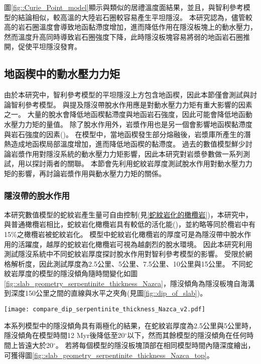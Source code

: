 圖\ref{fig::Curie_Point_model}顯示與\citealp{Manea2011Curie}類似的居禮溫度面結果，並且，與智利參考模型的結論相似，較高溫的大陸岩石圈較容易產生平坦隱沒。
本研究認為，儘管較高的岩石圈溫度會導致地函黏滯度增加，進而降低作用在隱沒板塊上的動水壓力，然而溫度升高同時導致岩石圈強度下降，此時隱沒板塊容易將弱的地函岩石圈推開，促使平坦隱沒發育。

\subsection{地函楔中的動水壓力力矩}
由於本研究中，智利參考模型的平坦隱沒上方包含地函楔，因此本節僅會測試與討論智利參考模型。
\citealp{Manea2007}與\citealp{Yan2020}提及隱沒帶脫水作用應是對動水壓力力矩有重大影響的因素之一。
大量的脫水會降低地函楔黏滯度與地函岩石強度，因此可能會降低地函動水壓力力矩的量值。
除了脫水作用外，岩漿作用也是另一個會影響地函楔黏滯度與岩石強度的因素(\citealp{jamieson2011crustal})。
在模型中，當地函楔發生部分熔融後，岩漿庫所產生的潛熱造成地函楔局部溫度增加，進而降低地函楔的黏滯度。
過去的數值模型鮮少討論岩漿作用對隱沒系統的動水壓力力矩影響，因此本研究對岩漿參數做一系列測試，用以探討兩者的關聯。
本節會先利用蛇紋岩厚度測試脫水作用對動水壓力力矩的影響，再討論岩漿作用與動水壓力力矩的關係。

\subsubsection{隱沒帶的脫水作用}
本研究數值模型的蛇紋岩產生量可自由控制(見\ref{蛇紋岩化的橄欖岩})，本研究中，與普通橄欖岩相比，蛇紋岩化橄欖岩具有較低的活化能(\citealp{hilairet2007high})，並約略等同於欖岩中有15$\%$之橄欖岩被蛇紋岩化。
模型中蛇紋岩化橄欖岩的厚度可是為隱沒帶中脫水作用的活躍度，越厚的蛇紋岩化橄欖岩可視為越劇烈的脫水環境。
因此本研究利用測試隱沒系統中不同蛇紋岩厚度探討脫水作用對智利參考模型的影響。
受限於網格解析度，因此測試厚度為2.5公里、5公里、7.5公里、10公里與15公里。
不同蛇紋岩厚度的模型的隱沒傾角隨時間變化如圖\ref{fig::slab_geometry_serpentinite_thickness_Nazca}，隱沒傾角為隱沒板塊自海溝到深度150公里之間的直線與水平之夾角(見圖\ref{fig::dip_of_slab})。

\begin{figure*}[h]
    \centering
    \texttt{[image: compare\_dip\_serpentinite\_thickness\_Nazca\_v2.pdf]}
    \caption[不同蛇紋岩厚度的模型的隱沒傾角隨時間變化圖]{不同蛇紋岩厚度的模型的隱沒傾角隨時間變化圖。}
    \label{fig::slab_geometry_serpentinite_thickness_Nazca}
\end{figure*}

本系列模型中的隱沒傾角具有兩極化的結果，在蛇紋岩厚度為2.5公里與5公里時，隱沒傾角在模型時間12 Myr後降低至20$^{\circ}$以下，然而其餘模型的隱沒傾角在任何時間上皆遠大於20$^{\circ}$。
若將每個模型的隱沒板塊頂部在相同模型時間內隨深度繪出，可獲得圖\ref{fig::slab_geometry_serpentinite_thickness_Nazca_top}。


